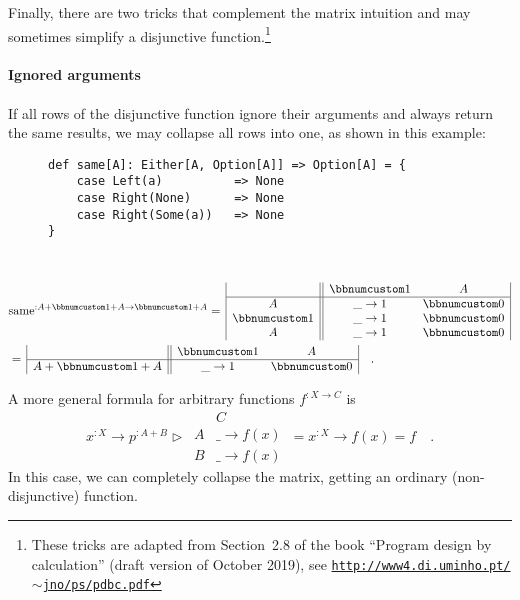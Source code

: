 Finally, there are two tricks that complement the matrix intuition
and may sometimes simplify a disjunctive function.\footnote{These tricks are adapted from Section~2.8 of the book \textsf{``}Program
design by calculation\textsf{''} (draft version of October 2019), see \texttt{\href{http://www4.di.uminho.pt/~jno/ps/pdbc.pdf}{http://www4.di.uminho.pt/$\sim$jno/ps/pdbc.pdf}}}

\paragraph{Ignored arguments}

If all rows of the disjunctive function ignore their arguments and
always return the same results, we may collapse all rows into one,
as shown in this example:

\begin{wrapfigure}{L}{0.5\columnwidth}%
\vspace{-0.2\baselineskip}
\begin{lstlisting}
def same[A]: Either[A, Option[A]] => Option[A] = {
    case Left(a)          => None
    case Right(None)      => None
    case Right(Some(a))   => None
}
\end{lstlisting}
\vspace{-3\baselineskip}
\end{wrapfigure}%

~\vspace{-1.4\baselineskip}
\begin{align*}
 & \text{same}^{:A+\bbnum 1+A\rightarrow\bbnum 1+A}=\,\begin{array}{|c||cc|}
 & \bbnum 1 & A\\
\hline A & \_\rightarrow1 & \bbnum 0\\
\bbnum 1 & \_\rightarrow1 & \bbnum 0\\
A & \_\rightarrow1 & \bbnum 0
\end{array}\\
 & =\,\begin{array}{|c||cc|}
 & \bbnum 1 & A\\
\hline A+\bbnum 1+A & \_\rightarrow1 & \bbnum 0
\end{array}\quad.
\end{align*}
\vspace{-1\baselineskip}

A more general formula for arbitrary functions $f^{:X\rightarrow C}$
is
\[
x^{:X}\rightarrow p^{:A+B}\triangleright\,\begin{array}{|c||c|}
 & C\\
\hline A & \_\rightarrow f(x)\\
B & \_\rightarrow f(x)
\end{array}\,=x^{:X}\rightarrow f(x)=f\quad.
\]
In this case, we can completely collapse the matrix, getting an ordinary
(non-disjunctive) function.

